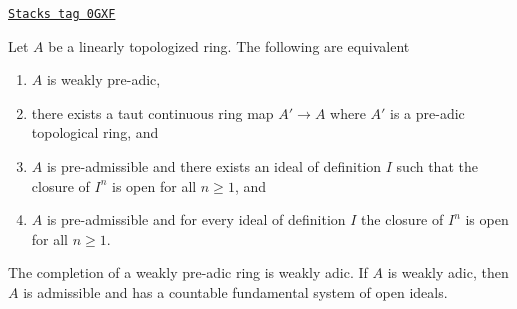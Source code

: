 \begin{lemma}
\label{formal-spaces-lemma-weakly-adic}
\href{https://stacks.math.columbia.edu/tag/0GXF}{\texttt{Stacks tag 0GXF}}

Let $A$ be a linearly topologized ring. The following are equivalent
\begin{enumerate}
\item $A$ is weakly pre-adic,
\item there exists a taut continuous ring map $A' \to A$
where $A'$ is a pre-adic topological ring, and
\item $A$ is pre-admissible and there exists an ideal of definition $I$
such that the closure of $I^n$ is open for all $n \geq 1$, and
\item $A$ is pre-admissible and for every ideal of definition $I$
the closure of $I^n$ is open for all $n \geq 1$.
\end{enumerate}
The completion of a weakly pre-adic ring is weakly adic.
If $A$ is weakly adic, then $A$ is admissible and has a countable
fundamental system of open ideals.
\end{lemma}

